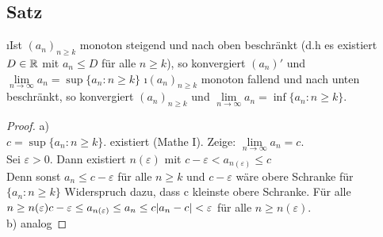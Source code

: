 \subsection[Satz: Monotonie und Konvergenz]{Satz}\label{sec:2.16}
\begin{enumerate}[a)]
\i Ist $(a_n)_{n \geq k}$ monoton steigend und nach oben beschränkt (d.h es existiert $D \in \mathbb{R}$ mit $a_n \leq D$ für alle $n \geq k$), so konvergiert $(a_n)'$ und $\lim\limits_{n \rightarrow \infty}a_n = \sup\{a_n: n\geq k \}$
\i $(a_n)_{n \geq k}$ monoton fallend und nach unten beschränkt, so konvergiert $(a_n)_{n \geq k}$ und $\lim\limits_{n \rightarrow \infty} a_n = \inf \{a_n: n\geq k \}.$
\begin{proof}
a)\\
$ c = \sup \{a_n : n \geq k\}.$ existiert (Mathe I).
Zeige: $\lim\limits_{n \to \infty}a_n = c$.\\
Sei $\varepsilon > 0$. Dann existiert $n(\varepsilon)$ mit $c-\varepsilon < a_{n(\varepsilon)} \leq c$\\
Denn sonst $a_n \leq c - \varepsilon$ für alle $n \geq k$ und $c - \varepsilon$ wäre obere Schranke für $\{a_n : n \geq k \}$ Widerspruch dazu, dass c kleinste obere Schranke. Für alle $n \geq n(\varepsilon)\\
c- \varepsilon \leq a_{n(\varepsilon)} \leq a_n \leq c\\
\lvert a_n -c \rvert < \varepsilon$ für alle $n \geq n(\varepsilon).$\\
b) analog
\end{proof}
\end{enumerate}
